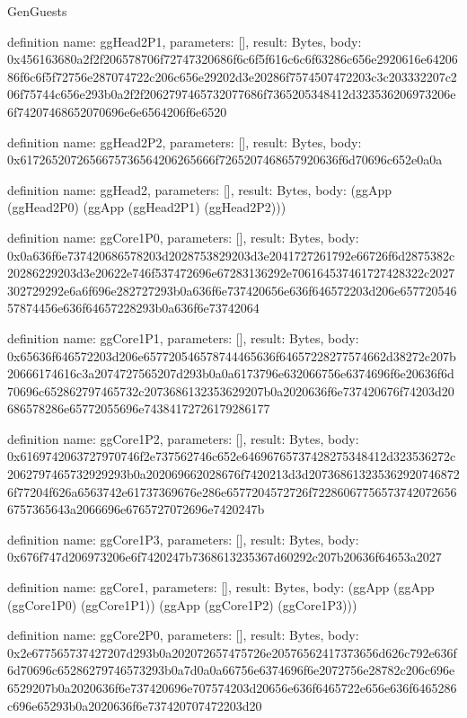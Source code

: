 \begin{lexlean}{GenGuests}
\begin{semanticmodule}
definition{
  name: ggHead2P1,
  parameters: [],
  result: Bytes,
  body: 0x456163680a2f2f206578706f72747320686f6c6f5f616c6c6f63286c656e2920616e6420686f6c6f5f72756e287074722c206c656e29202d3e20286f7574507472203c3c203332207c206f75744c656e293b0a2f2f2062797465732077686f7365205348412d323536206973206e6f74207468652070696e6e6564206f6e6520
}

definition{
  name: ggHead2P2,
  parameters: [],
  result: Bytes,
  body: 0x6172652072656675736564206265666f7265207468657920636f6d70696c652e0a0a
}

definition{
  name: ggHead2,
  parameters: [],
  result: Bytes,
  body: (ggApp (ggHead2P0) (ggApp (ggHead2P1) (ggHead2P2)))
}

definition{
  name: ggCore1P0,
  parameters: [],
  result: Bytes,
  body: 0x0a636f6e737420686578203d2028753829203d3e2041727261792e66726f6d2875382c20286229203d3e20622e746f537472696e67283136292e706164537461727428322c2027302729292e6a6f696e282727293b0a636f6e737420656e636f646572203d206e65772054657874456e636f64657228293b0a636f6e73742064
}

definition{
  name: ggCore1P1,
  parameters: [],
  result: Bytes,
  body: 0x65636f646572203d206e657720546578744465636f64657228277574662d38272c207b20666174616c3a2074727565207d293b0a0a6173796e632066756e6374696f6e20636f6d70696c652862797465732c2073686132353629207b0a2020636f6e737420676f74203d20686578286e65772055696e74384172726179286177
}

definition{
  name: ggCore1P2,
  parameters: [],
  result: Bytes,
  body: 0x6169742063727970746f2e737562746c652e64696765737428275348412d323536272c2062797465732929293b0a202069662028676f7420213d3d2073686132353629207468726f77204f626a6563742e61737369676e286e6577204572726f722860677565737420726566757365643a2066696e6765727072696e7420247b
}

definition{
  name: ggCore1P3,
  parameters: [],
  result: Bytes,
  body: 0x676f747d206973206e6f7420247b7368613235367d60292c207b20636f64653a2027
}

definition{
  name: ggCore1,
  parameters: [],
  result: Bytes,
  body: (ggApp (ggApp (ggCore1P0) (ggCore1P1)) (ggApp (ggCore1P2) (ggCore1P3)))
}

definition{
  name: ggCore2P0,
  parameters: [],
  result: Bytes,
  body: 0x2e677565737427207d293b0a202072657475726e20576562417373656d626c792e636f6d70696c65286279746573293b0a7d0a0a66756e6374696f6e2072756e28782c206c696e6529207b0a2020636f6e737420696e707574203d20656e636f6465722e656e636f6465286c696e65293b0a2020636f6e737420707472203d20
}


\end{semanticmodule}
\end{lexlean}
